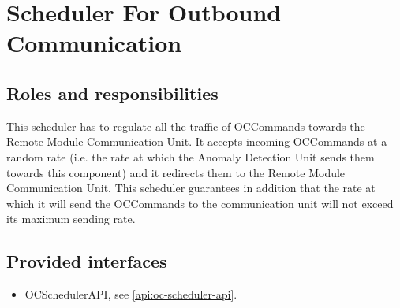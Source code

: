 \section{Scheduler For Outbound Communication}
\label{element:scheduler-for-outbound-communication}

\subsection{Roles and responsibilities}

\npar This scheduler has to regulate all the traffic of OCCommands towards the
Remote Module Communication Unit. It accepts incoming OCCommands at a random
rate (i.e. the rate at which the Anomaly Detection Unit sends them towards this
component) and it redirects them to the Remote Module Communication Unit. This
scheduler guarantees in addition that the rate at which it will send the
OCCommands to the communication unit will not exceed its maximum
sending rate.

\subsection{Provided interfaces}

\begin{itemize}
  \item OCSchedulerAPI, see \ref{api:oc-scheduler-api}.
\end{itemize}
